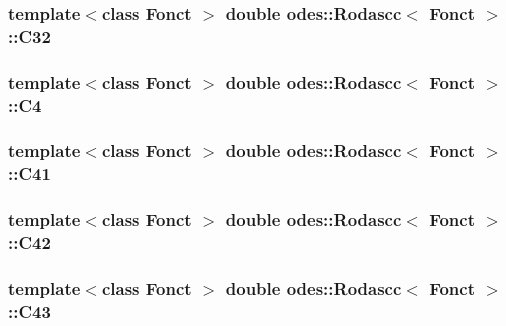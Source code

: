\hypertarget{classodes_1_1Rodascc_af4d022ac0b5b295414c28bedadee649d}{
\subsubsection[{C32}]{\setlength{\rightskip}{0pt plus 5cm}template$<$class Fonct $>$ double {\bf odes\-::\-Rodascc}$<$ Fonct $>$\-::C32\hspace{0.3cm}{\ttfamily [private]}}}\label{classodes_1_1Rodascc_af4d022ac0b5b295414c28bedadee649d}
\hypertarget{classodes_1_1Rodascc_a00fd3100c01161a52b07bea58438abb7}{
\subsubsection[{C4}]{\setlength{\rightskip}{0pt plus 5cm}template$<$class Fonct $>$ double {\bf odes\-::\-Rodascc}$<$ Fonct $>$\-::C4\hspace{0.3cm}{\ttfamily [private]}}}\label{classodes_1_1Rodascc_a00fd3100c01161a52b07bea58438abb7}
\hypertarget{classodes_1_1Rodascc_a4b7e54a608ccdbb2dfb93c51ac39768e}{
\subsubsection[{C41}]{\setlength{\rightskip}{0pt plus 5cm}template$<$class Fonct $>$ double {\bf odes\-::\-Rodascc}$<$ Fonct $>$\-::C41\hspace{0.3cm}{\ttfamily [private]}}}\label{classodes_1_1Rodascc_a4b7e54a608ccdbb2dfb93c51ac39768e}
\hypertarget{classodes_1_1Rodascc_ab5e8aff5c6f8ae319a99271ffbdb7c70}{
\subsubsection[{C42}]{\setlength{\rightskip}{0pt plus 5cm}template$<$class Fonct $>$ double {\bf odes\-::\-Rodascc}$<$ Fonct $>$\-::C42\hspace{0.3cm}{\ttfamily [private]}}}\label{classodes_1_1Rodascc_ab5e8aff5c6f8ae319a99271ffbdb7c70}
\hypertarget{classodes_1_1Rodascc_affb187bef97a0ef45d4f56537f731dfe}{
\subsubsection[{C43}]{\setlength{\rightskip}{0pt plus 5cm}template$<$class Fonct $>$ double {\bf odes\-::\-Rodascc}$<$ Fonct $>$\-::C43\hspace{0.3cm}{\ttfamily [private]}}}\label{classodes_1_1Rodascc_affb187bef97a0ef45d4f56537f731dfe}
